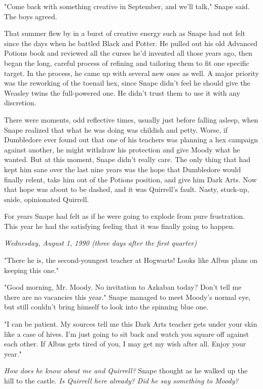 \documentclass[a4paper,11pt]{article}
\begin{document}
"Come back with something creative in September, and we'll talk," Snape said. The boys agreed.

That summer flew by in a burst of creative energy such as Snape had not felt since the days when he battled Black and Potter. He pulled out his old Advanced Potions book and reviewed all the curses he'd invented all those years ago, then began the long, careful process of refining and tailoring them to fit one specific target. In the process, he came up with several new ones as well. A major priority was the reworking of the toenail hex, since Snape didn't feel he should give the Weasley twins the full-powered one. He didn't trust them to use it with any discretion.

There were moments, odd reflective times, usually just before falling asleep, when Snape realized that what he was doing was childish and petty. Worse, if Dumbledore ever found out that one of his teachers was planning a hex campaign against another, he might withdraw his protection and give Moody what he wanted. But at this moment, Snape didn't really care. The only thing that had kept him sane over the last nine years was the hope that Dumbledore would finally relent, take him out of the Potions position, and give him Dark Arts. Now that hope was about to be dashed, and it was Quirrell's fault. Nasty, stuck-up, snide, opinionated Quirrell.

For years Snape had felt as if he were going to explode from pure frustration. This year he had the satisfying feeling that it was finally going to happen.

\emph{Wednesday, August 1, 1990 (three days after the first quarter)}

"There he is, the second-youngest teacher at Hogwarts! Looks like Albus plans on keeping this one."

"Good morning, Mr. Moody. No invitation to Azkaban today? Don't tell me there are no vacancies this year." Snape managed to meet Moody's normal eye, but still couldn't bring himself to look into the spinning blue one.

"I can be patient. My sources tell me this Dark Arts teacher gets under your skin like a case of hives. I'm just going to sit back and watch you square off against each other. If Albus gets tired of you, I may get my wish after all. Enjoy your year."

\emph{How does he know about me and Quirrell?} Snape thought as he walked up the hill to the castle. \emph{Is Quirrell here already? Did he say something to Moody?}
\end{document}
